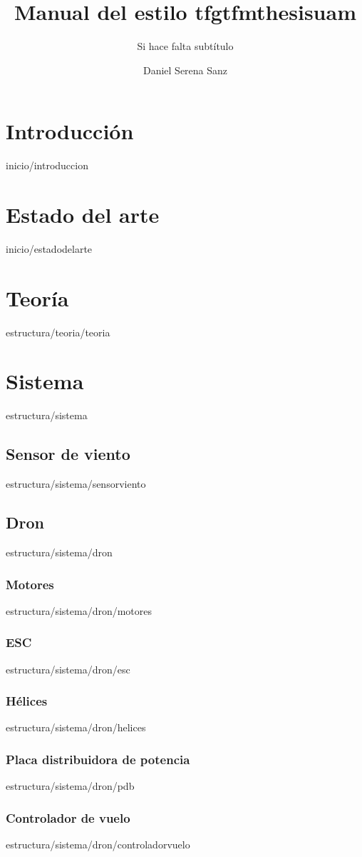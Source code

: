 \documentclass[epsbased,copyright,final,printable,covers,extendedindex,firstnumbered,tfg,gnuplot]{tfgtfmthesisuam}
\title{Manual del estilo tfgtfmthesisuam}
\subtitle{Si hace falta subtítulo}
\author{Daniel Serena Sanz}
\begin{document}
\chapter{Introducción\label{CAP:INTRODUCCION}}{inicio/introduccion}
\chapter{Estado del arte\label{CAP:ESTADODELARTE}}{inicio/estadodelarte}
\chapter{Teoría\label{CAP:INTRODUCCION}}{estructura/teoria/teoria}
\chapter{Sistema\label{CAP:SISTEMA}}{estructura/sistema}

\section{Sensor de viento\label{SEC:SENSORVIENTO}}{estructura/sistema/sensorviento}

\section{Dron\label{SEC:DRON}}{estructura/sistema/dron}
\subsection{Motores\label{SS:motores}}{estructura/sistema/dron/motores}
\subsection{ESC\label{SS:ESC}}{estructura/sistema/dron/esc}
\subsection{Hélices\label{SS:Hélices}}{estructura/sistema/dron/helices}
\subsection{Placa distribuidora de potencia\label{SS:PDB}}{estructura/sistema/dron/pdb}
\subsection{Controlador de vuelo\label{SS:ControladorVuelo}}{estructura/sistema/dron/controladorvuelo}
\end{document}

